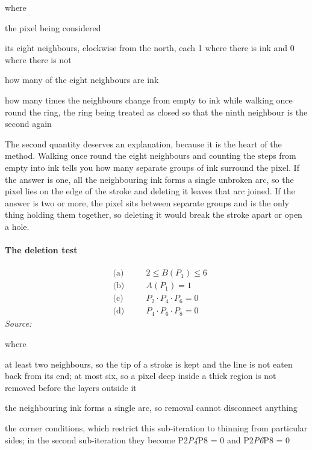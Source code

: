 \noindent where
\begin{description}[leftmargin=2.4em,style=nextline,font=\normalfont\ttfamily]\setlength\itemsep{1pt}
  \item[{$P_1$}] \normalfont the pixel being considered
  \item[{$P_2 \ldots P_9$}] \normalfont its eight neighbours, clockwise from the north, each 1 where there is ink and 0 where there is not
  \item[{$B(P_1)$}] \normalfont how many of the eight neighbours are ink
  \item[{$A(P_1)$}] \normalfont how many times the neighbours change from empty to ink while walking once round the ring, the ring being treated as closed so that the ninth neighbour is the second again
\end{description}
The second quantity deserves an explanation, because it is the heart of the method. Walking once round the eight neighbours and counting the steps from empty into ink tells you how many separate groups of ink surround the pixel. If the answer is one, all the neighbouring ink forms a single unbroken arc, so the pixel lies on the edge of the stroke and deleting it leaves that arc joined. If the answer is two or more, the pixel sits between separate groups and is the only thing holding them together, so deleting it would break the stroke apart or open a hole.


\paragraph{The deletion test}

\begin{equation}
\begin{aligned}&\text{(a)}\quad && 2 \le B(P_1) \le 6 \\&\text{(b)}\quad && A(P_1) = 1 \\&\text{(c)}\quad && P_2 \cdot P_4 \cdot P_6 = 0 \\&\text{(d)}\quad && P_4 \cdot P_6 \cdot P_8 = 0\end{aligned}
\end{equation}
\noindent\emph{Source: }\cite{zhangsuen1984}


\noindent where
\begin{description}[leftmargin=2.4em,style=nextline,font=\normalfont\ttfamily]\setlength\itemsep{1pt}
  \item[{$(a)$}] \normalfont at least two neighbours, so the tip of a stroke is kept and the line is not eaten back from its end; at most six, so a pixel deep inside a thick region is not removed before the layers outside it
  \item[{$(b)$}] \normalfont the neighbouring ink forms a single arc, so removal cannot disconnect anything
  \item[{$(c), (d)$}] \normalfont the corner conditions, which restrict this sub-iteration to thinning from particular sides; in the second sub-iteration they become P2\emph{P4}P8 = 0 and P2\emph{P6}P8 = 0
\end{description}

